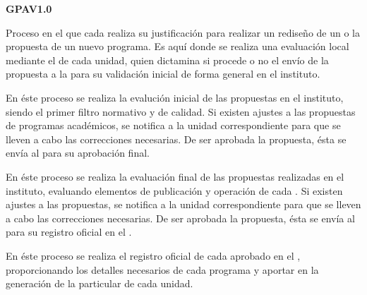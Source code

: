 \begin{PDescripcion}
	
	\Ppaso \textbf{GPAV1.0}
	
	\begin{enumerate}
		\Ppaso[\PSubProceso]  Proceso en el que cada  realiza su justificación para realizar un rediseño de un  o la propuesta de un nuevo programa. Es aquí donde se realiza una evaluación local mediante el  de cada unidad, quien dictamina si procede o no el envío de la propuesta a la para su validación inicial de forma general en el instituto.		

		\Ppaso[\PSubProceso]  En éste proceso se realiza la evalución inicial de las propuestas en el instituto, siendo el primer filtro normativo y de calidad. Si existen ajustes a las propuestas de programas académicos, se notifica a la unidad correspondiente para que se lleven a cabo las correcciones necesarias. De ser aprobada la propuesta, ésta se envía al  para su aprobación final.

		\Ppaso[\PSubProceso]  En éste proceso se realiza la evaluación final de las propuestas realizadas en el instituto, evaluando elementos de publicación y operación de cada . Si existen ajustes a las propuestas, se notifica a la unidad correspondiente para que se lleven a cabo las correcciones necesarias. De ser aprobada la propuesta, ésta se envía al  para su registro oficial en el .

		\Ppaso[\PSubProceso]  En éste proceso se realiza el registro oficial de cada  aprobado en el , proporcionando los detalles necesarios de cada programa y aportar en la generación de la  particular de cada unidad.
		
		
	\end{enumerate}


\end{PDescripcion}
